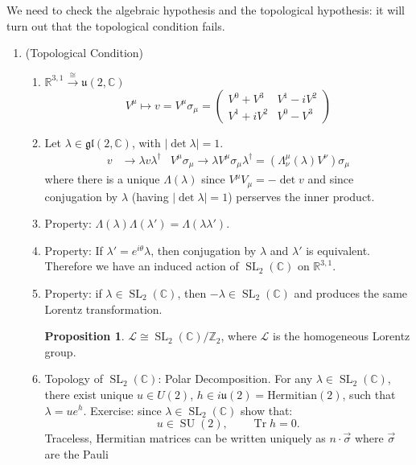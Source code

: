 \documentclass[10pt]{article}
\newcommand{\bZ}{\mathbb Z}
\newcommand{\bR}{\mathbb{R}}
\newcommand{\bC}{\mathbb{C}}
\newcommand{\ms}{\mathscr}
\newcommand{\mf}{\mathfrak}
\newcommand{\sg}{\sigma}
\theoremstyle{plain}
\theoremstyle{definition}
\newtheorem{prop}{Proposition}
\theoremstyle{remark}
\DeclareMathOperator{\SL}{SL}
\DeclareMathOperator{\SU}{SU}
\DeclareMathOperator{\Tr}{Tr}
\def\bP{\begin{pmatrix}}
\def\eP{\end{pmatrix}}
\newcommand{\lam}{\lambda}
\begin{document}
We need to check the algebraic hypothesis and the topological
hypothesis: it will turn out that the topological condition fails.

\begin{enumerate}
    \item (Topological Condition)
        \begin{enumerate}
            \item $\bR^{3,1} \xrightarrow{\;\cong\;} \mf u(2,\bC)$
                \[ V^\mu \mapsto v = V^\mu\sg_\mu = \bP V^0+V^3 & V^1
                - iV^2 \\ V^1+iV^2 & V^0 - V^3 \eP\]
            \item Let $\lam\in\mf{gl}(2,\bC)$, with $|\det\lam|=1$.
                \begin{align*}
                    v &\to \lam v \lam^\dag   & 
                    V^\mu\sg_\mu \to 
                    \lam V^\mu\sg_\mu \lam^\dag = 
                    (\Lambda^\mu_\nu(\lam) V^\nu)\sg_\mu
                \end{align*}
                where there is a unique $\Lambda(\lam)$ since $V^\mu
                V_\mu = -\det v$ and since conjugation by $\lam$
                (having $|\det\lam|=1$) perserves the inner product.
            \item Property: $\Lambda(\lam)\Lambda(\lam') = \Lambda(\lam\lam')$.
            \item Property: If $\lam' = e^{i\theta}\lam$, then
                conjugation by $\lam$ and $\lam'$ is equivalent.
                Therefore we have an induced action of $\SL_2(\bC)$ on
                $\bR^{3,1}$.
            \item Property: if $\lam\in\SL_2(\bC)$, then
                $-\lam\in\SL_2(\bC)$ and produces the same Lorentz
                transformation.
                \begin{prop}
                    $\ms L \cong \SL_2(\bC)/\bZ_2$, where $\ms L$ is
                    the homogeneous Lorentz group.
                \end{prop}
            \item Topology of $\SL_2(\bC)$: Polar Decomposition.
                For any $\lam\in\SL_2(\bC)$, there exist unique $u\in
                U(2)$, $h\in i\mf u(2) = \mathrm{Hermitian}(2)$, such
                that $\lam = u e^{h}$. Exercise: since $\lam \in
                \SL_2(\bC)$ show that: 
                \[ u\in \SU(2), \qquad \Tr h = 0. \]
                Traceless, Hermitian matrices can be written uniquely
                as $n\cdot\vec \sg$ where $\vec\sg$ are the Pauli

\end{enumerate}
\end{enumerate}
\end{document}
